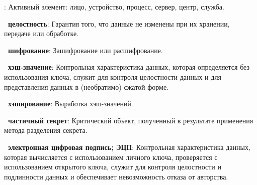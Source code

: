 
:
Активный элемент: лицо, устройство, процесс, сервер, центр, служба.


{\bf \thedefctr~целостность}:
Гарантия того, что данные не изменены при их хранении, передаче или обработке. 

{\bf \thedefctr~шифрование}:
Зашифрование или расшифрование.

{\bf \thedefctr~хэш-значение}:
Контрольная характеристика данных, которая определяется без использования ключа,
служит для контроля целостности данных и для представления данных в (необратимо)
сжатой форме.

{\bf \thedefctr~хэширование}:
Выработка хэш-значений.

{\bf \thedefctr~частичный секрет}:
Критический объект, 
полученный в результате применения метода разделения секрета.

{\bf \thedefctr~электронная цифровая подпись; ЭЦП}:
Контрольная характеристика данных, которая вычисляется с использованием личного
ключа, проверяется с использованием открытого ключа, служит для контроля
целостности и подлинности данных и обеспечивает невозможность отказа от
авторства.

